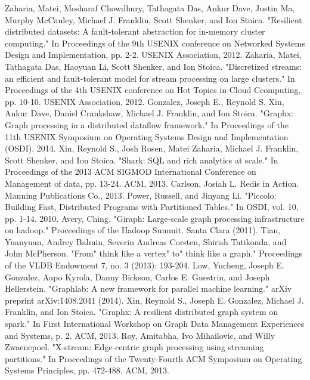 \documentclass[conference]{IEEEtran}
\begin{document}
\begin{thebibliography}{1}
Zaharia, Matei, Mosharaf Chowdhury, Tathagata Das, Ankur Dave, Justin Ma, Murphy McCauley, Michael J. Franklin, Scott Shenker, and Ion Stoica. "Resilient distributed datasets: A fault-tolerant abstraction for in-memory cluster computing." In Proceedings of the 9th USENIX conference on Networked Systems Design and Implementation, pp. 2-2. USENIX Association, 2012.
Zaharia, Matei, Tathagata Das, Haoyuan Li, Scott Shenker, and Ion Stoica. "Discretized streams: an efficient and fault-tolerant model for stream processing on large clusters." In Proceedings of the 4th USENIX conference on Hot Topics in Cloud Ccomputing, pp. 10-10. USENIX Association, 2012.
Gonzalez, Joseph E., Reynold S. Xin, Ankur Dave, Daniel Crankshaw, Michael J. Franklin, and Ion Stoica. "Graphx: Graph processing in a distributed dataflow framework." In Proceedings of the 11th USENIX Symposium on Operating Systems Design and Implementation (OSDI). 2014.
Xin, Reynold S., Josh Rosen, Matei Zaharia, Michael J. Franklin, Scott Shenker, and Ion Stoica. "Shark: SQL and rich analytics at scale." In Proceedings of the 2013 ACM SIGMOD International Conference on Management of data, pp. 13-24. ACM, 2013.
Carlson, Josiah L. Redis in Action. Manning Publications Co., 2013.
Power, Russell, and Jinyang Li. "Piccolo: Building Fast, Distributed Programs with Partitioned Tables." In OSDI, vol. 10, pp. 1-14. 2010.
Avery, Ching. "Giraph: Large-scale graph processing infrastructure on hadoop." Proceedings of the Hadoop Summit. Santa Clara (2011).
Tian, Yuanyuan, Andrey Balmin, Severin Andreas Corsten, Shirish Tatikonda, and John McPherson. "From" think like a vertex" to" think like a graph." Proceedings of the VLDB Endowment 7, no. 3 (2013): 193-204.
Low, Yucheng, Joseph E. Gonzalez, Aapo Kyrola, Danny Bickson, Carlos E. Guestrin, and Joseph Hellerstein. "Graphlab: A new framework for parallel machine learning." arXiv preprint arXiv:1408.2041 (2014).
Xin, Reynold S., Joseph E. Gonzalez, Michael J. Franklin, and Ion Stoica. "Graphx: A resilient distributed graph system on spark." In First International Workshop on Graph Data Management Experiences and Systems, p. 2. ACM, 2013.
Roy, Amitabha, Ivo Mihailovic, and Willy Zwaenepoel. "X-stream: Edge-centric graph processing using streaming partitions." In Proceedings of the Twenty-Fourth ACM Symposium on Operating Systems Principles, pp. 472-488. ACM, 2013.

\end{thebibliography}
\end{document}

